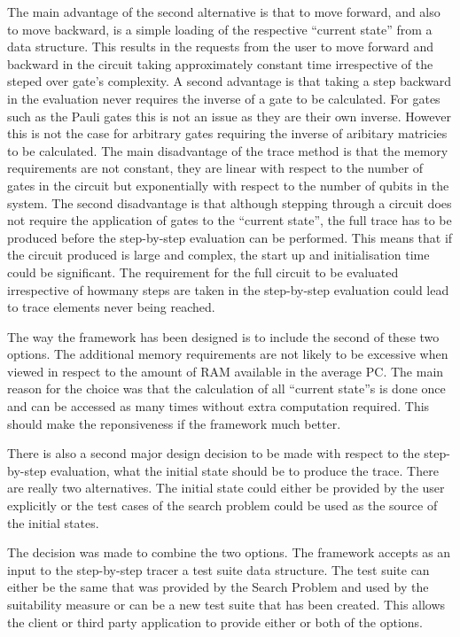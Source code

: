 The main advantage of the second alternative is that to move forward, and also to move backward, is a simple loading of the respective ``current state'' from a data structure.
This results in the requests from the user to move forward and backward in the circuit taking approximately constant time irrespective of the steped over gate's complexity.
A second advantage is that taking a step backward in the evaluation never requires the inverse of a gate to be calculated.
For gates such as the Pauli gates this is not an issue as they are their own inverse.
However this is not the case for arbitrary gates requiring the inverse of aribitary matricies to be calculated.
The main disadvantage of the trace method is that the memory requirements are not constant, they are linear with respect to the number of gates in the circuit but exponentially with respect to the number of qubits in the system.
The second disadvantage is that although stepping through a circuit does not require the application of gates to the ``current state'', the full trace has to be produced before the step-by-step evaluation can be performed.
This means that if the circuit produced is large and complex, the start up and initialisation time could be significant.
The requirement for the full circuit to be evaluated irrespective of howmany steps are taken in the step-by-step evaluation could lead to trace elements never being reached.

The way the framework has been designed is to include the second of these two options.
The additional memory requirements are not likely to be excessive when viewed in respect to the amount of RAM available in the average PC.
The main reason for the choice was that the calculation of all ``current state''s is done once and can be accessed as many times without extra computation required.
This should make the reponsiveness if the framework much better.

There is also a second major design decision to be made with respect to the step-by-step evaluation, what the initial state should be to produce the trace.
There are really two alternatives.
The initial state could either be provided by the user explicitly or the test cases of the search problem could be used as the source of the initial  states.

The decision was made to combine the two options.
The framework accepts as an input to the step-by-step tracer a test suite data structure.
The test suite can either be the same that was provided by the Search Problem and used by the suitability measure or can be a new test suite that has been created.
This allows the client or third party application to provide either or both of the options.

